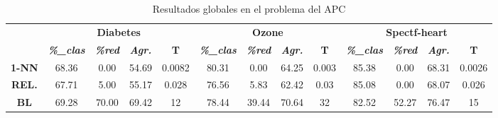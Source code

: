 \begin{table}[H]
	\centering
	\caption{Resultados globales en el problema del APC												
	}
	\label{tab:final}
	\begin{tabular}{ccccccccccccc}
		&
		\multicolumn{4}{c}{\cellcolor[HTML]{C0C0C0}\textbf{Diabetes}} &
		\multicolumn{4}{c}{\cellcolor[HTML]{C0C0C0}\textbf{Ozone}} &
		\multicolumn{4}{c}{\cellcolor[HTML]{C0C0C0}\textbf{Spectf-heart}} \\
		\multirow{-2}{*}{} &
		\cellcolor[HTML]{DAE8FC}\textit{\textbf{\%\_clas}} &
		\cellcolor[HTML]{DAE8FC}\textit{\textbf{\%red}} &
		\cellcolor[HTML]{DAE8FC}\textit{\textbf{Agr.}} &
		\cellcolor[HTML]{DAE8FC}\textbf{T} &
		\cellcolor[HTML]{DAE8FC}\textit{\textbf{\%\_clas}} &
		\cellcolor[HTML]{DAE8FC}\textit{\textbf{\%red}} &
		\cellcolor[HTML]{DAE8FC}\textit{\textbf{Agr.}} &
		\cellcolor[HTML]{DAE8FC}\textbf{T} &
		\cellcolor[HTML]{DAE8FC}\textit{\textbf{\%\_clas}} &
		\cellcolor[HTML]{DAE8FC}\textit{\textbf{\%red}} &
		\cellcolor[HTML]{DAE8FC}\textit{\textbf{Agr.}} &
		\cellcolor[HTML]{DAE8FC}\textbf{T} \\ \cline{2-13} 
		\multicolumn{1}{c|}{\cellcolor[HTML]{C0C0C0}\textbf{1-NN}} &
		\multicolumn{1}{c|}{68.36} &
		\multicolumn{1}{c|}{0.00} &
		\multicolumn{1}{c|}{{\color[HTML]{FE0000} 54.69}} &
		\multicolumn{1}{c|}{0.0082} &
		\multicolumn{1}{c|}{80.31} &
		\multicolumn{1}{c|}{0.00} &
		\multicolumn{1}{c|}{{\color[HTML]{FE0000} 64.25}} &
		\multicolumn{1}{c|}{0.003} &
		\multicolumn{1}{c|}{85.38} &
		\multicolumn{1}{c|}{0.00} &
		\multicolumn{1}{c|}{{\color[HTML]{FE0000} 68.31}} &
		\multicolumn{1}{c|}{0.0026} \\ \cline{2-13} 
		\multicolumn{1}{c|}{\cellcolor[HTML]{C0C0C0}\textbf{REL.}} &
		\multicolumn{1}{c|}{67.71} &
		\multicolumn{1}{c|}{5.00} &
		\multicolumn{1}{c|}{{\color[HTML]{FE0000} 55.17}} &
		\multicolumn{1}{c|}{0.028} &
		\multicolumn{1}{c|}{76.56} &
		\multicolumn{1}{c|}{5.83} &
		\multicolumn{1}{c|}{{\color[HTML]{FE0000} 62.42}} &
		\multicolumn{1}{c|}{0.03} &
		\multicolumn{1}{c|}{85.08} &
		\multicolumn{1}{c|}{0.00} &
		\multicolumn{1}{c|}{{\color[HTML]{FE0000} 68.07}} &
		\multicolumn{1}{c|}{0.026} \\ \cline{2-13} 
		\multicolumn{1}{c|}{\cellcolor[HTML]{C0C0C0}\textbf{BL}} &
		\multicolumn{1}{c|}{69.28} &
		\multicolumn{1}{c|}{70.00} &
		\multicolumn{1}{c|}{{\color[HTML]{FE0000} 69.42}} &
		\multicolumn{1}{c|}{12} &
		\multicolumn{1}{c|}{78.44} &
		\multicolumn{1}{c|}{39.44} &
		\multicolumn{1}{c|}{{\color[HTML]{FE0000} 70.64}} &
		\multicolumn{1}{c|}{32} &
		\multicolumn{1}{c|}{82.52} &
		\multicolumn{1}{c|}{52.27} &
		\multicolumn{1}{c|}{{\color[HTML]{FE0000} 76.47}} &
		\multicolumn{1}{c|}{15} \\ \cline{2-13} 
	\end{tabular}
\end{table}
